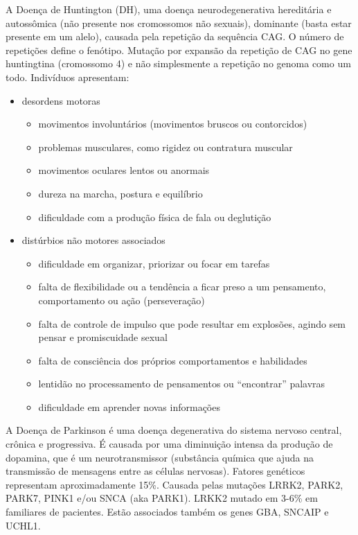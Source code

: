 \documentclass[
	article,			%
	12pt,				%
	oneside,			%
	a4paper,			%
	english,			%
	brazil,				%
	sumario=tradicional
	]{abntex2}
\begin{document}
A Doença de Huntington (DH), uma doença neurodegenerativa hereditária e autossômica (não presente nos cromossomos não sexuais), dominante (basta estar presente em um alelo), causada pela repetição da sequência CAG. O número de repetições define o fenótipo. Mutação por expansão da repetição de CAG no gene huntingtina (cromossomo 4) e não simplesmente a repetição no genoma como um todo.
Indivíduos apresentam:
\begin{itemize}

    \item desordens motoras
    	\begin{itemize}
			\item  movimentos involuntários (movimentos bruscos ou contorcidos)
			\item  problemas musculares, como rigidez ou contratura muscular
			\item  movimentos oculares lentos ou anormais
			\item  dureza na marcha, postura e equilíbrio
			\item  dificuldade com a produção física de fala ou deglutição
    	\end{itemize}
    
    \item distúrbios não motores associados
        \begin{itemize}
			\item dificuldade em organizar, priorizar ou focar em tarefas
			\item falta de flexibilidade ou a tendência a ficar preso a um pensamento, comportamento ou ação (perseveração) 
			\item falta de controle de impulso que pode resultar em explosões, agindo sem pensar e promiscuidade sexual
			\item falta de consciência dos próprios comportamentos e habilidades
			\item lentidão no processamento de pensamentos ou ``encontrar'' palavras
			\item dificuldade em aprender novas informações
		\end{itemize}
		
\end{itemize}

A Doença de Parkinson é uma doença degenerativa do sistema nervoso central, crônica e progressiva. É causada por uma diminuição intensa da produção de dopamina, que é um neurotransmissor (substância química que ajuda na transmissão de mensagens entre as células nervosas). Fatores genéticos representam aproximadamente 15\%. Causada pelas mutações LRRK2,	PARK2,	PARK7,	PINK1	e/ou SNCA	(aka	PARK1). LRKK2	mutado	em	3-6\%	em	familiares	de	pacientes. Estão associados também os genes GBA,	SNCAIP	e	UCHL1.
\end{document}
